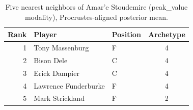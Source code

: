 \begin{table}[htbp]
  \centering\small
  \begin{tabular}{rllc}
    \toprule
    Rank & Player & Position & Archetype \\
    \midrule
    1 & Tony Massenburg & F & 4 \\
    2 & Bison Dele & C & 4 \\
    3 & Erick Dampier & C & 4 \\
    4 & Lawrence Funderburke & F & 4 \\
    5 & Mark Strickland & F & 2 \\
    \bottomrule
  \end{tabular}
  \caption{Five nearest neighbors of Amar'e Stoudemire (peak_value modality), Procrustes-aligned posterior mean.}
  \label{tab:Amar_e_Stoudemire_neighbors_peak_value}
\end{table}

